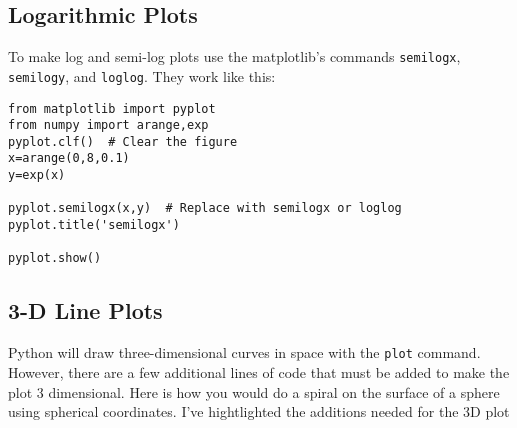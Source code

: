 \subsection*{Logarithmic Plots}
  To make log and
semi-log plots use the matplotlib's commands {\tt semilogx}, {\tt semilogy}, and
{\tt loglog}. They work like this:
\begin{Verbatim}
from matplotlib import pyplot
from numpy import arange,exp
pyplot.clf()  # Clear the figure
x=arange(0,8,0.1)
y=exp(x)

pyplot.semilogx(x,y)  # Replace with semilogx or loglog
pyplot.title('semilogx')

pyplot.show()
\end{Verbatim}

\subsection*{3-D Line Plots}
   Python will
draw three-dimensional curves in space with the {\tt plot} command.
However, there are a few additional lines of code that must be added
to make the plot 3 dimensional.  Here is how you would do a spiral on
the surface of a sphere using spherical coordinates.  I've
hightlighted the additions needed for the 3D plot

